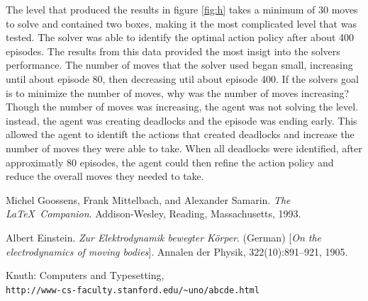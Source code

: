 \documentclass[times, 10pt,twocolumn]{article}
\begin{document}
The level that produced the results in figure \ref{fig:h} takes a minimum of 30 moves to solve and contained two boxes, making it the most complicated level that was tested. The solver was able to identify the optimal action policy after about 400 episodes. The results from this data provided the most insigt into the solvers performance. The number of moves that the solver used began small, increasing until about episode 80, then decreasing util about episode 400. If the solvers goal is to minimize the number of moves, why was the number of moves increasing? Though the number of moves was increasing, the agent was not solving the level. instead, the agent was creating deadlocks and the episode was ending early. This allowed the agent to identift the actions that created deadlocks and increase the number of moves they were able to take. When all deadlocks were identified, after approximatly 80 episodes, the agent could then refine the action policy and reduce the overall moves they needed to take.




\nocite{ex1,ex2}



\begin{thebibliography}{9}
Michel Goossens, Frank Mittelbach, and Alexander Samarin. 
\textit{The \LaTeX\ Companion}. 
Addison-Wesley, Reading, Massachusetts, 1993.
 
Albert Einstein. 
\textit{Zur Elektrodynamik bewegter K{\"o}rper}. (German) 
[\textit{On the electrodynamics of moving bodies}]. 
Annalen der Physik, 322(10):891–921, 1905.
 
Knuth: Computers and Typesetting,
\\\texttt{http://www-cs-faculty.stanford.edu/\~{}uno/abcde.html}
\end{thebibliography}
\end{document}
